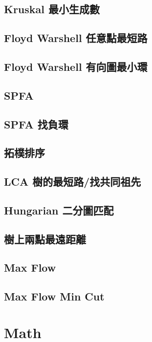 \subsection{Kruskal 最小生成數}

\subsection{Floyd Warshell 任意點最短路}

\subsection{Floyd Warshell 有向圖最小環}

\subsection{SPFA}

\subsection{SPFA 找負環}

\subsection{拓樸排序}

\subsection{LCA 樹的最短路/找共同祖先}

\subsection{Hungarian 二分圖匹配}

\subsection{樹上兩點最遠距離}

\subsection{Max Flow}

\subsection{Max Flow Min Cut}


\section{Math}
